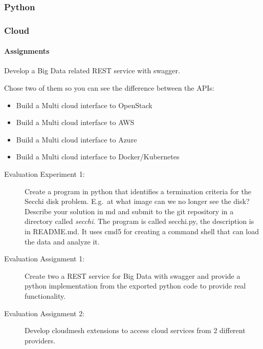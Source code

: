 \subsubsection{Python}


\subsubsection{Cloud}



\paragraph{Assignments}

Develop a Big Data related REST service with swagger.

Chose two of them so you can see the difference between the APIs:

\begin{itemize}
\item Build a Multi cloud interface to OpenStack
\item Build a Multi cloud interface to AWS
\item Build a Multi cloud interface to Azure
\item Build a Multi cloud interface to Docker/Kubernetes
\end{itemize}


\begin{description}
\item[Evaluation Experiment 1:] Create a program in python that
  identifies a termination criteria for the Secchi disk
  problem. E.g.\ at what image can we no longer see the disk?
  Describe your solution in md and submit to the git repository in a
  directory called \textit{secchi}. The program is called secchi.py, the
  description is in README.md. It uses cmd5 for creating a command
  shell that can load the data and analyze it. 
\item[Evaluation Assignment 1:] Create two a REST service for Big Data
  with swagger and provide a python implementation from the exported
  python code to provide real functionality.
\item[Evaluation Assignment 2:] Develop cloudmesh extensions to access
  cloud services from 2 different providers.
\end{description}

